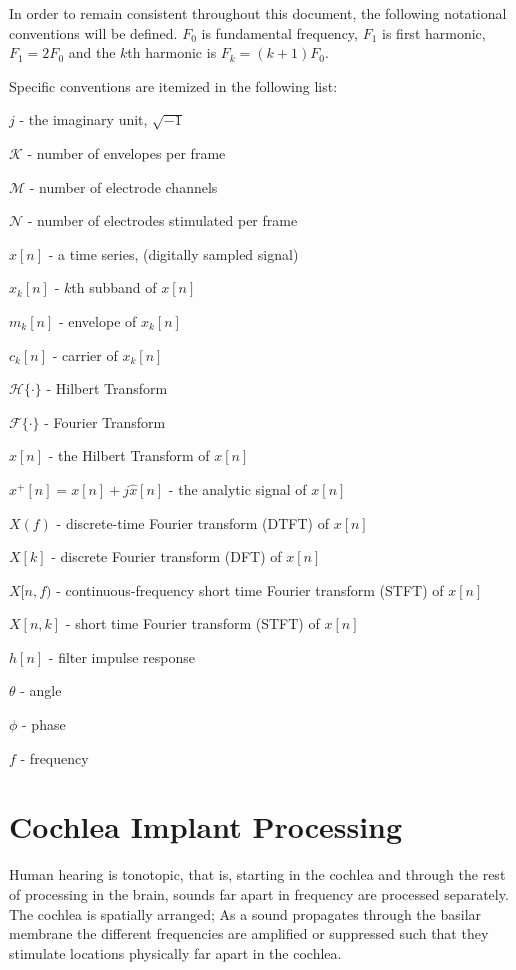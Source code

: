 \documentclass [11pt, proquest,oneside] {ganter_thesis}[2015/03/03]
\begin{document}
In order to remain consistent throughout this document, the following notational conventions will be defined.  $F_0$ is fundamental frequency, $F_1$ is first harmonic, $F_1 = 2F_0$ and the $k$th harmonic is $F_k = (k+1)F_0$.

Specific conventions are itemized in the following list:

$j$ - the imaginary unit, $\sqrt{-1}$

$\mathcal{K}$ - number of envelopes per frame

$\mathcal{M}$ - number of electrode channels

$\mathcal{N}$ - number of electrodes stimulated per frame

$x[n]$ - a time series, (digitally sampled signal)

$x_k[n]$ - $k$th subband of $x[n]$

$m_k[n]$ - envelope of $x_k[n]$

$c_k[n]$ - carrier of $x_k[n]$

$\mathcal{H}\{\cdot\}$ - Hilbert Transform

$\mathcal{F}\{\cdot\}$ - Fourier Transform

$\widehat{x}[n]$ - the Hilbert Transform of $x[n]$

$x^+[n] = x[n] + j\widehat{x}[n]$ - the analytic signal of $x[n]$

$X(f)$ - discrete-time Fourier transform (DTFT) of $x[n]$

$X[k]$ - discrete Fourier transform (DFT) of $x[n]$

$X[n,f)$ - continuous-frequency short time Fourier transform (STFT) of $x[n]$

$X[n,k]$ - short time Fourier transform (STFT) of $x[n]$

$h[n]$ - filter impulse response

$\theta$ - angle

$\phi$ - phase

$f$ - frequency


\chapter{Cochlea Implant Processing}\label{ch:ci_processing}

Human hearing is tonotopic, that is, starting in the cochlea and through the rest of processing in the brain, sounds far apart in frequency are processed separately.  The cochlea is spatially arranged; As a sound propagates through the basilar membrane the different frequencies are amplified or suppressed such that they stimulate locations physically far apart in the cochlea.
\end{document}
